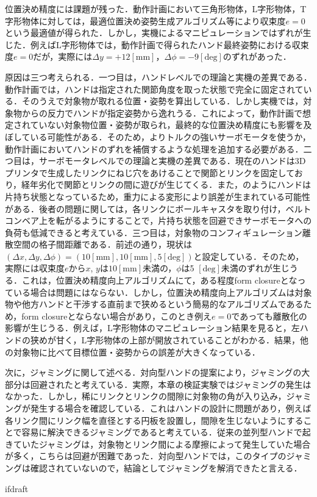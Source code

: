 \documentclass[a4paper,twoside,12pt,papersize, dvipdfmx]{iirthesis}
\begin{document}
位置決め精度には課題が残った．動作計画において三角形物体，L字形物体，T字形物体に対しては，最適位置決め姿勢生成アルゴリズム等により収束度$e=0$という最適値が得られた．しかし，実機によるマニピュレーションではずれが生じた．例えばL字形物体では，動作計画で得られたハンド最終姿勢における収束度$e=0$だが，実際には$\Delta y = +12 \mathrm{[mm]}$，$\Delta \phi = -9 \mathrm{[deg]}$のずれがあった．\par
原因は三つ考えられる．一つ目は，ハンドレベルでの理論と実機の差異である．動作計画では，ハンドは指定された関節角度を取った状態で完全に固定されている．そのうえで対象物が取れる位置・姿勢を算出している．しかし実機では，対象物からの反力でハンドが指定姿勢から逸れうる．これによって，動作計画で想定されていない対象物位置・姿勢が取られ，最終的な位置決め精度にも影響を及ぼしている可能性がある．そのため，よりトルクの強いサーボモータを使うか，動作計画においてハンドのずれを補償するような処理を追加する必要がある．二つ目は，サーボモータレベルでの理論と実機の差異である．現在のハンドは3Dプリンタで生成したリンクにねじ穴をあけることで関節とリンクを固定しており，経年劣化で関節とリンクの間に遊びが生じてくる．また，のようにハンドは片持ち状態となっているため，重力による変形により誤差が生まれている可能性がある．後者の問題に関しては，各リンクにボールキャスタを取り付け，ベルトコンベア上を転がるようにすることで，片持ち状態を回避できサーボモータへの負荷も低減できると考えている．三つ目は，対象物のコンフィギュレーション離散空間の格子間距離である．前述の通り，現状は$(\Delta x, \Delta y, \Delta \phi) = (10 \mathrm{[mm]}, 10 \mathrm{[mm]}, 5 \mathrm{[deg]})$と設定している．そのため，実際には収束度$e$から$x$, $y$は$10 \mathrm{[mm]}$未満の，$\phi$は5 $\mathrm{[deg]}$未満のずれが生じうる．これは，位置決め精度向上アルゴリズムにて，ある程度form closureとなっている場合は問題にはならない．しかし，位置決め精度向上アルゴリズムは対象物や他方ハンドと干渉する直前まで狭めるという簡易的なアルゴリズムであるため，form closureとならない場合があり，このとき例え$e=0$であっても離散化の影響が生じうる．例えば，L字形物体のマニピュレーション結果を見ると，左ハンドの狭めが甘く，L字形物体の上部が開放されていることがわかる．結果，他の対象物に比べて目標位置・姿勢からの誤差が大きくなっている．


次に，ジャミングに関して述べる．対向型ハンドの提案により，ジャミングの大部分は回避されたと考えている．実際，本章の検証実験ではジャミングの発生はなかった．しかし，稀にリンクとリンクの間隙に対象物の角が入り込み，ジャミングが発生する場合を確認している．これはハンドの設計に問題があり，例えば各リンク間にリンク幅を直径とする円板を設置し，間隙を生じないようにすることで容易に解決できるジャミングであると考えている．従来の並列型ハンドで起きていたジャミングは，対象物とリンク間による摩擦によって発生していた場合が多く，こちらは回避が困難であった．対向型ハンドでは，このタイプのジャミングは確認されていないので，結論としてジャミングを解消できたと言える．




\expandafter\ifx\csname ifdraft\endcsname\relax
    
\end{document}
